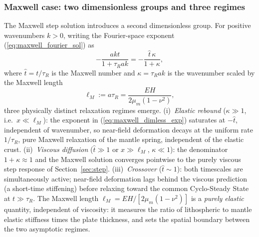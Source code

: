 \documentclass[extra]{gji}
\begin{document}
\subsubsection{Maxwell case: two dimensionless groups and three regimes}

The Maxwell step solution introduces a second dimensionless group.  For
positive wavenumbers $k>0$, writing the Fourier-space exponent
(\ref{eq:maxwell_fourier_sol}) as
\begin{equation}
-\frac{akt}{1+\tau_R ak}
= -\frac{\hat{t}\,\kappa}{1+\kappa},
\label{eq:maxwell_dimless_exp}
\end{equation}
where $\hat{t} = t/\tau_R$ is the Maxwell number and $\kappa = \tau_R ak$ is
the wavenumber scaled by the Maxwell length
\begin{equation}
\ell_M := a\tau_R = \frac{EH}{2\mu_m(1-\nu^2)},
\label{eq:maxwell_length}
\end{equation}
three physically distinct relaxation regimes emerge.
(i)~\emph{Elastic rebound} ($\kappa\gg 1$, i.e.\ $x\ll\ell_M$): the
exponent in (\ref{eq:maxwell_dimless_exp}) saturates at $-\hat{t}$,
independent of wavenumber, so near-field deformation decays at the uniform
rate $1/\tau_R$, pure Maxwell relaxation of the mantle spring,
independent of the elastic crust.
(ii)~\emph{Viscous diffusion} ($\hat{t}\gg 1$ or $x\gg\ell_M$, $\kappa\ll 1$):
the denominator $1+\kappa\approx 1$ and the Maxwell solution converges
pointwise to the purely viscous step response of
Section~\ref{sec:step}.
(iii)~\emph{Crossover} ($\hat{t}\sim 1$): both timescales are simultaneously
active; near-field deformation lags behind the viscous prediction (a
short-time stiffening) before relaxing toward the common Cyclo-Steady
State at $t\gg\tau_R$.
The Maxwell length $\ell_M = EH/[2\mu_m(1-\nu^2)]$ is a \emph{purely
elastic} quantity, independent of viscosity: it measures the ratio of
lithospheric to mantle elastic stiffness times the plate thickness, and
sets the spatial boundary between the two asymptotic regimes.
\end{document}
